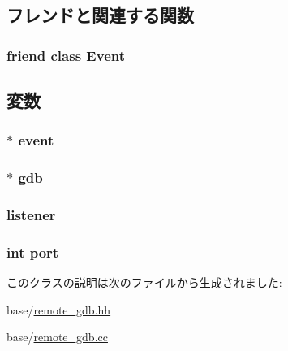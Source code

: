 \subsection{フレンドと関連する関数}
\hypertarget{classGDBListener_a3c7b3c89bf96f51e80a919b3a82a3915}{
\subsubsection[{Event}]{\setlength{\rightskip}{0pt plus 5cm}friend class {\bf Event}}}
\label{classGDBListener_a3c7b3c89bf96f51e80a919b3a82a3915}


\subsection{変数}
\hypertarget{classGDBListener_a765488c8f26c7f8713d5245212dcae01}{
\subsubsection[{event}]{$\ast$ {\bf event}}}
\label{classGDBListener_a765488c8f26c7f8713d5245212dcae01}
\hypertarget{classGDBListener_abc7630d7a55d0751927fed9b12d7b202}{
\subsubsection[{gdb}]{$\ast$ {\bf gdb}}}
\label{classGDBListener_abc7630d7a55d0751927fed9b12d7b202}
\hypertarget{classGDBListener_acf9ea448b26a541b4a197f1ca92f700b}{
\subsubsection[{listener}]{ {\bf listener}}}
\label{classGDBListener_acf9ea448b26a541b4a197f1ca92f700b}
\hypertarget{classGDBListener_a63c89c04d1feae07ca35558055155ffb}{
\subsubsection[{port}]{\setlength{\rightskip}{0pt plus 5cm}int {\bf port}}}
\label{classGDBListener_a63c89c04d1feae07ca35558055155ffb}


このクラスの説明は次のファイルから生成されました:\begin{DoxyCompactItemize}
\item 
base/\hyperlink{base_2remote__gdb_8hh}{remote\_\-gdb.hh}\item 
base/\hyperlink{base_2remote__gdb_8cc}{remote\_\-gdb.cc}\end{DoxyCompactItemize}
